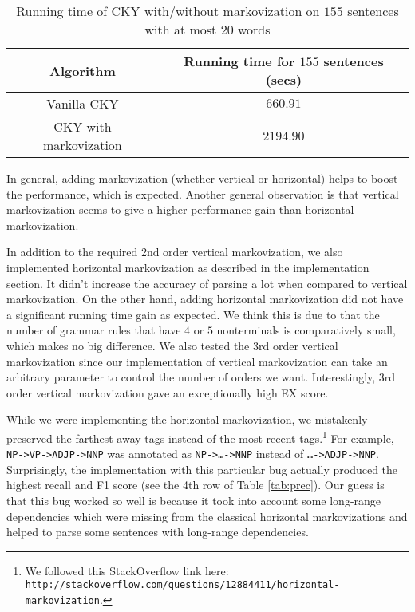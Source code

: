 \documentclass[letterpaper]{article}
\begin{document}
\begin{table}
\begin{center}
\begin{tabular}{|c|c|}
\hline
Algorithm & Running time for $155$ sentences (secs) \\
\hline
Vanilla CKY & $660.91$ \\
\hline
CKY with markovization & $2194.90$ \\
\hline
\end{tabular}
\caption{Running time of CKY with/without markovization on $155$ sentences with at most $20$ words}\label{tab:time}
\end{center}
\end{table}
In general, adding markovization (whether vertical or horizontal) helps to boost the performance, which is expected. Another general observation is that vertical markovization seems to give a higher performance gain than horizontal markovization.

In addition to the required 2nd order vertical markovization, we also implemented horizontal markovization as described in the implementation section. It didn't increase the accuracy of parsing a lot when compared to  vertical markovization. On the other hand, adding horizontal markovization did not have a significant running time gain as expected. We think this is due to that the number of grammar rules that have $4$ or $5$ nonterminals is comparatively small, which makes no big difference. 
We also tested the 3rd order vertical markovization since our implementation of vertical markovization can take an arbitrary parameter to control the number of orders we want.
Interestingly, 3rd order vertical markovization gave an exceptionally high EX score.

\vspace{0.25cm}

While we were implementing the horizontal markovization, we mistakenly preserved the farthest away tags instead of the most recent tags.\footnote{We followed this StackOverflow link here:  \texttt{http://stackoverflow.com/questions/12884411/horizontal-markovization}.}
For example, \texttt{NP->VP->ADJP->NNP} was annotated as \texttt{NP->\dots->NNP}  instead of \texttt{\dots->ADJP->NNP}. Surprisingly, the implementation with this particular bug actually produced the highest recall and F1 score (see the 4th row of Table \ref{tab:prec}).
Our guess is that this bug worked so well is because it took into account some long-range dependencies which were missing from the classical horizontal markovizations and helped to parse some sentences with long-range dependencies.
\end{document}
